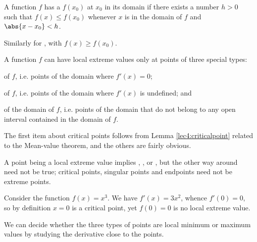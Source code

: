 \begin{definition}
	A function $f$ has a  $f(x_0)$ at $x_0$ in its domain if there exists a number $h > 0$ such that $f(x) \leq f(x_0)$ whenever $x$ is in the domain of $f$ and $\abs{x - x_0} < h$.

	Similarly for , with $f(x) \geq f(x_0)$.
\end{definition}

\noindent
A function $f$ can have local extreme values only at points of three special types:
\begin{romanlist}
	\item {} of $f$, i.e. points of the domain where $f'(x) = 0$;
	\item {} of $f$, i.e. points of the domain where $f'(x)$ is undefined; and
	\item {} of the domain of $f$, i.e. points of the domain that do not belong to any open interval contained in the domain of $f$.
\end{romanlist}

\noindent
The first item about critical points follows from Lemma \ref{lec4:criticalpoint} related to the Mean-value theorem, and the others are fairly obvious.

A point being a local extreme value implies , , or , but the other way around need not be true; critical points, singular points and endpoints need not be extreme points.

\begin{counterexample}
	Consider the function $f(x) = x^3$.
	We have $f'(x) = 3 x^2$, whence $f'(0) = 0$, so by definition $x = 0$ is a critical point, yet $f(0) = 0$ is no local extreme value.
\end{counterexample}

\noindent
We can decide whether the three types of points are local minimum or maximum values by studying the derivative close to the points.

